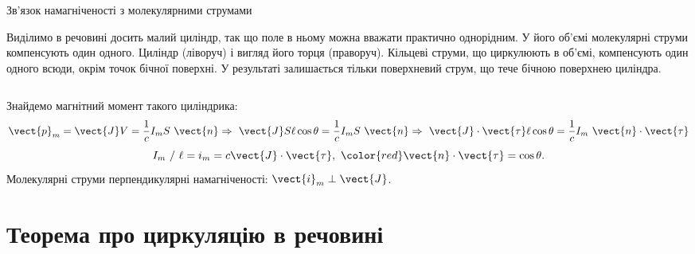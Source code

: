 \documentclass[onlytextwidth]{beamer}
\begin{document}
\begin{frame}{Зв'язок намагніченості з молекулярними струмами}{}
	\begin{block}{}\justifying\scriptsize
		Виділимо в речовині досить малий циліндр, так що поле в ньому можна вважати практично однорідним. У його об'ємі молекулярні струми компенсують один
		одного. Циліндр (ліворуч) і вигляд його торця (праворуч). Кільцеві струми, що циркулюють в об'ємі, компенсують один одного всюди, окрім точок бічної
		поверхні. У результаті залишається тільки поверхневий струм, що тече бічною поверхнею циліндра.
	\end{block}
	\begin{columns}
		\begin{column}{0.5\linewidth}\centering
			
		\end{column}
		\begin{column}{0.5\linewidth}\centering
			
		\end{column}
	\end{columns}
	\begin{block}{}\small
		Знайдемо магнітний момент такого циліндрика:
		\begin{equation*}
			\vect{p}_m = \vect{J}V = \frac1c I_mS\ \vect{n} \Rightarrow\ \vect{J}S\ell\cos\theta = \frac1c I_m S\ \vect{n}
			\Rightarrow\ \vect{J}\cdot\vect{\tau} \ell\cos\theta  = \frac1c I_m \ \vect{n}\cdot\vect{\tau}
		\end{equation*}
		\begin{equation*}
			{I_m}\ /\ {\ell} = i_m = c\vect{J}\cdot\vect{\tau},\ {\color{red}\vect{n}\cdot\vect{\tau} = \cos\theta}.
		\end{equation*}
		\alert{Молекулярні струми перпендикулярні намагніченості: $\vect{i}_m \perp \vect{J}$.}
	\end{block}
\end{frame}




\section{Теорема про циркуляцію в речовині}
\end{document}
